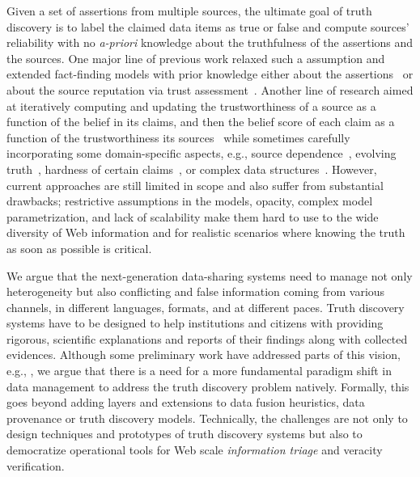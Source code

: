 \documentclass[prodmode,acmtecs]{acmsmall} %
\begin{document}
Given a set of assertions from multiple sources, the ultimate goal of truth discovery is to label the claimed
data items as true or false and compute sources' reliability with no \emph{a-priori} knowledge about the 
truthfulness of the assertions and the sources. One major line of previous work relaxed such a assumption and extended 
fact-finding models with prior knowledge either about the assertions~\cite{PasternackR13} or about the source 
reputation via trust assessment~\cite{BalakrishnanK11}. Another line of research aimed at iteratively computing 
and updating the trustworthiness of a source as a function of the belief in its claims, and then the belief score 
of each claim as a function of the trustworthiness its sources~\cite{YinHY08} while sometimes carefully incorporating 
some domain-specific aspects, e.g., source dependence~\cite{DongBHS10a}, evolving truth~\cite{DongBS09a}, hardness of 
certain claims~\cite{GallandAMS10}, or complex data structures~\cite{ZhaoRGH12,GoasdoueKKLMZ13}.
However, current approaches are still limited in scope and also suffer from substantial drawbacks; restrictive 
assumptions in the models, opacity, complex model parametrization, and lack of scalability make them hard to use 
to the wide diversity of Web information and for realistic scenarios where knowing the truth as soon as possible 
is critical. 




 We argue that the next-generation data-sharing systems need to manage not only heterogeneity but also conflicting and false 
 information  coming from various channels, in different languages, formats, and at different paces. Truth discovery systems  have to be designed to help institutions and citizens with providing rigorous, scientific explanations and reports 
 of their findings along with collected evidences.
 Although some preliminary work have addressed parts of this vision, e.g., \cite{DongS2013,DongBHS10a,LiDLMS12}, we argue that there is a need for a more fundamental paradigm shift in data management  to address the truth discovery problem natively. Formally, this goes beyond adding layers and extensions to data fusion heuristics, data provenance or truth discovery models. Technically, the challenges are not only to  design techniques and prototypes of truth discovery systems but also to democratize operational tools for Web scale {\it information  triage} and veracity verification.
  
  
  

 
\end{document}
